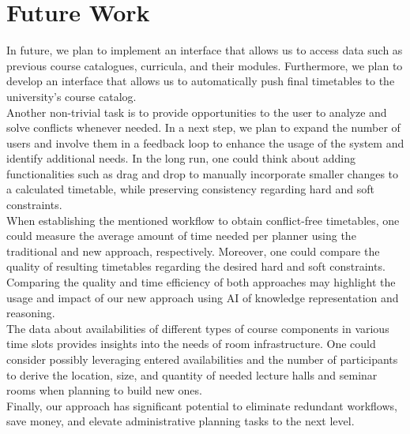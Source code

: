 \documentclass{easychair}
\begin{document}
\section{Future Work}
\label{sec:future}
  In future, we plan to implement an interface that allows us to access data such as previous course catalogues, curricula, and their modules.
  Furthermore, we plan to develop an interface that allows us to automatically push final timetables to the university's course catalog. \\
  Another non-trivial task is to provide opportunities to the user to analyze and solve conflicts whenever needed.  
  In a next step, we plan to expand the number of users and involve them in a feedback loop to enhance the usage of the system and identify additional needs.
  In the long run, one could think about adding functionalities such as drag and drop to manually incorporate smaller changes to a calculated timetable, while preserving consistency regarding hard and soft constraints. \\
  When establishing the mentioned workflow to obtain conflict-free timetables, one could measure the average amount of time needed per planner using the traditional and new approach, respectively.
  Moreover, one could compare the quality of resulting timetables regarding the desired hard and soft constraints. 
  Comparing the quality and time efficiency of both approaches may highlight the usage and impact of our new approach using AI of knowledge representation and reasoning. \\
  The data about availabilities of different types of course components in various time slots provides insights into the needs of room infrastructure. 
  One could consider possibly leveraging entered availabilities and the number of participants to derive the location, size, and quantity of needed lecture halls and seminar rooms when planning to build new ones. \\
  Finally, our approach has significant potential to eliminate redundant workflows, save money, and elevate administrative planning tasks to the next level. 


\label{sec:bib}

%
%
%



\end{document}
